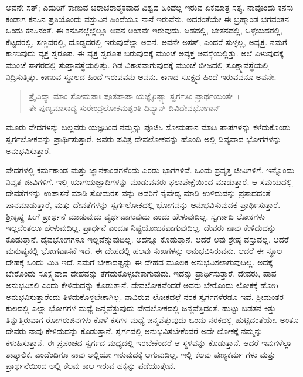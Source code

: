 ಅವನೇ ಸತ್​; ಎದುರಿಗೆ ಕಾಣುವ ಚರಾಚರಾತ್ಮಕವಾದ ವಿಶ್ವದ ಹಿಂದೆಲ್ಲ ಇರುವ ಏಕಮಾತ್ರ ಸತ್ಯ. ನಾವೊಂದು ಕನಸು ಕಂಡಾಗ ಕನಸಿನ ಪ್ರತಿಯೊಂದು ವಸ್ತುವಿನ ಹಿಂದೆಯೂ ನಾನೆ ಇರುವೆನು. ಅದರಂತೆಯೇ ಈ ಬ್ರಹ್ಮಾಂಡ ಭಗವಂತನ ಒಂದು ಕನಸಿನಂತೆ. ಈ ಕನಸಿನಲ್ಲೆಲ್ಲೆಲ್ಲೂ ಅವನ ಅಂಶವೇ ಇರುವುದು. ಜಡದಲ್ಲಿ, ಚೇತನದಲ್ಲಿ, ಒಳ್ಳೆಯದರಲ್ಲಿ, ಕೆಟ್ಟದರಲ್ಲಿ, ಸಣ್ಣದರಲ್ಲಿ, ದೊಡ್ಡದರಲ್ಲಿ ಇರುವುದೆಲ್ಲಾ ಅವನೆ. ಅವನೇ ಅಸತ್​; ಎಂದರೆ ಸುಳ್ಳಲ್ಲ, ಅವ್ಯಕ್ತ. ನಮಗೆ ಕಾಣುವುದು ವ್ಯಕ್ತ ಸ್ವರೂಪ. ಈ ವ್ಯಕ್ತ ಸ್ವರೂಪ ಬರುವುದಕ್ಕೆ ಮುಂಚೆ ಅವ್ಯಕ್ತ ಅವಸ್ಥೆಯಲ್ಲಿತ್ತು. ಅಲೆ ಏಳುವುದಕ್ಕೆ ಮುಂಚೆ ಸಾಗರದಲ್ಲಿ ಸುಪ್ತಾವಸ್ಥೆಯಲ್ಲಿತ್ತು. ಗಿಡ ವಿಕಾಸವಾಗುವುದಕ್ಕೆ ಮುಂಚೆ ಬೀಜದಲ್ಲಿ ಸೂಕ್ಷ್ಮಾವಸ್ಥೆಯಲ್ಲಿ ನಿದ್ರಿಸುತ್ತಿತ್ತು. ಕಾಣುವ ಸ್ಥೂಲದ ಹಿಂದೆ ಇರುವವನು ಅವನು. ಕಾಣದ ಸೂಕ್ಷ್ಮದ ಹಿಂದೆ ಇರುವವನೂ ಅವನೇ.

\begin{verse}
ತ್ರೈವಿದ್ಯಾ ಮಾಂ ಸೋಮಪಾಃ ಪೂತಪಾಪಾ ಯಜ್ಞೈರಿಷ್ಟ್ವಾ ಸ್ವರ್ಗತಿಂ ಪ್ರಾರ್ಥಯಂತೇ~।\\ತೇ ಪುಣ್ಯಮಾಸಾದ್ಯ ಸುರೇಂದ್ರಲೋಕಮಶ್ನಂತಿ ದಿವ್ಯಾನ್ ದಿವಿದೇವಭೋಗಾನ್ 
\end{verse}

{\small ಮೂರು ವೇದಗಳನ್ನು ಬಲ್ಲವರು ಯಜ್ಞದಿಂದ ನಮ್ಮನ್ನು ಪೂಜಿಸಿ ಸೋಮಪಾನ ಮಾಡಿ ಪಾಪಗಳನ್ನು ಕಳೆದುಕೊಂಡು ಸ್ವರ್ಗಲೋಕವನ್ನು ಪ್ರಾರ್ಥಿಸುತ್ತಾರೆ. ಅವರು ಪವಿತ್ರ ದೇವಲೋಕವನ್ನು ಹೊಂದಿ ಅಲ್ಲಿ ದಿವ್ಯವಾದ ಭೋಗಗಳನ್ನು ಅನುಭವಿಸುತ್ತಾರೆ.}

ವೇದಗಳಲ್ಲಿ ಕರ್ಮಕಾಂಡ ಮತ್ತು ಜ್ಞಾನಕಾಂಡಗಳೆಂದು ಎರಡು ಭಾಗಗಳಿವೆ. ಒಂದು ಪ್ರವೃತ್ತ ಜೀವಿಗಳಿಗೆ. ಇನ್ನೊಂದು ನಿವೃತ್ತ ಜೀವಿಗಳಿಗೆ. ಇಲ್ಲಿ ಯಾಗಯಜ್ಞಾದಿಗಳನ್ನು ಮಾಡುವವರು ಫಲಾಪೇಕ್ಷೆಯಿಂದ ಮಾಡುತ್ತಾರೆ. ಆ ಸಮಯದಲ್ಲಿ ದೇವತೆಗಳನ್ನು ಉಪಾಸನೆ ಮಾಡಿ ಸೋಮರಸ ವನ್ನು ಅವರಿಗೆ ನೈವೇದ್ಯ ಮಾಡಿ ಉಳಿದುದನ್ನು ಪ್ರಸಾದದಂತೆ ಪಾನಮಾಡುತ್ತಾರೆ, ಮತ್ತು ದೇವತೆಗಳನ್ನು ಸ್ವರ್ಗಲೋಕದಲ್ಲಿ ಭೋಗವನ್ನು ಅನುಭವಿಸುವುದಕ್ಕೆ ಪ್ರಾರ್ಥಿಸುತ್ತಾರೆ. ಶ‍್ರೀಕೃಷ್ಣ ಹೀಗೆ ಪ್ರಾರ್ಥನೆ ಮಾಡುವುದು ವ್ಯರ್ಥವಾಗುವುದು ಎಂದು ಹೇಳುವುದಿಲ್ಲ. ಸ್ವರ್ಗಾದಿ ಲೋಕಗಳು ಇಲ್ಲವೆಂತಲೂ ಹೇಳುವುದಿಲ್ಲ. ಪ್ರಾರ್ಥನೆ ಎಂದೂ ನಿಷ್ಪ್ರಯೋಜಕವಾಗುವುದಿಲ್ಲ. ದೇವರು ನಾವು ಕೇಳಿದುದನ್ನು ಕೊಡುತ್ತಾನೆ. ದೈವಭೋಗಗಳೂ ಇಲ್ಲವೆನ್ನುವುದಿಲ್ಲ. ಅದನ್ನೂ ಕೊಡುತ್ತಾನೆ. ಆದರೆ ಅವು ಶ್ರೇಷ್ಠ ವಸ್ತುವಲ್ಲ. ಆದರೆ ಮನುಷ್ಯನಲ್ಲಿ ಭೋಗವಾಸನೆ ಇದೆ. ಈ ದೇಹದಲ್ಲಿ ಹಲವು ಸುಖಗಳನ್ನು ಅನುಭವಿಸಿರುವನು. ಆದರೆ ಈ ಸ್ಥೂಲ ದೇಹಕ್ಕೆ ಒಂದು ಮಿತಿ ಇದೆ. ನಮಗೆ ಬೇಕಾದಷ್ಟನ್ನು ಈ ದೇಹದ ಮೂಲಕ ಅನುಭವಿಸಲಾಗುವುದಿಲ್ಲ. ಅದಕ್ಕೆ ಬೇರೊಂದು ಸೂಕ್ಷ್ಮವಾದ ದೇಹವನ್ನು ತೆಗೆದುಕೊಳ್ಳಬೇಕಾಗುವುದು. ಇದನ್ನು ಪ್ರಾರ್ಥಿಸುತ್ತಾರೆ. ದೇವರು, ಪಾಪ ಅನುಭವಿಸಲಿ ಎಂದು ಕೇಳಿದುದನ್ನು ಕೊಡುತ್ತಾನೆ. ದೇವಲೋಕವೆಂದರೆ ಅವರು ಬೇರೊಂದು ಲೋಕಕ್ಕೆ ಹೋಗಿ ಅನುಭವಿಸುತ್ತಾರೆಂದು ತಿಳಿದುಕೊಳ್ಳಬೇಕಾಗಿಲ್ಲ. ನಾವಿರುವ ಲೋಕದಲ್ಲೆ ನರಕ ಸ್ವರ್ಗಗಳೆರಡೂ ಇವೆ. ಶ‍್ರೀಮಂತರ ಕುಲದಲ್ಲಿ ಎಲ್ಲಾ ಭೋಗಗಳ ಮಧ್ಯೆ ಜನ್ಮವೆತ್ತುವುದು ದೇವಲೋಕದಲ್ಲಿ ಜನ್ಮವೆತ್ತಿದಂತೆ. ಹುಟ್ಟು ಬಡತನ ಕಿತ್ತು ತಿನ್ನುತ್ತಿರುವಾಗ ರೋಗರುಜಿನಗಳು ಕೊಳೆ ಕಸಗಳ ಮಧ್ಯೆ ಜನ್ಮವೆತ್ತುವುದು ಒಂದು ನರಕದಲ್ಲಿ ಹುಟ್ಟಿದಂತೆಯೇ. ಅಂತೂ ದೇವರು ನಾವು ಕೇಳಿದುದನ್ನು ಕೊಡುತ್ತಾನೆ. ಸ್ವರ್ಗದಲ್ಲಿ ಅನುಭವಿಸಬೇಕೆಂದರೆ ಅದೇ ಲೋಕಕ್ಕೆ ನಮ್ಮನ್ನು ಕಳುಹಿಸುತ್ತಾನೆ. ಈ ಪ್ರಪಂಚದ ಸ್ವರ್ಗದ ಮಧ್ಯದಲ್ಲಿ ಇರಬೇಕೆಂದರೆ ಆ ಸ್ಥಳವನ್ನು ಕೊಡುತ್ತಾನೆ. ಆದರೆ ಇವುಗಳೆಲ್ಲಾ ತಾತ್ಕಾಲಿಕ. ಎಂದೆಂದಿಗೂ ನಾವು ಅಲ್ಲಿಯೇ ಇರುವುದಕ್ಕೆ ಆಗುವುದಿಲ್ಲ. ಇಲ್ಲಿ ಕೆಲವು ಪುಣ್ಯಕರ್ಮ ಗಳು ಮತ್ತು ಪ್ರಾರ್ಥನೆಯಿಂದ ಅಲ್ಲಿ ಕೆಲವು ಕಾಲ ಇರುವ ಹಕ್ಕನ್ನು ಪಡೆಯುತ್ತೇವೆ.

